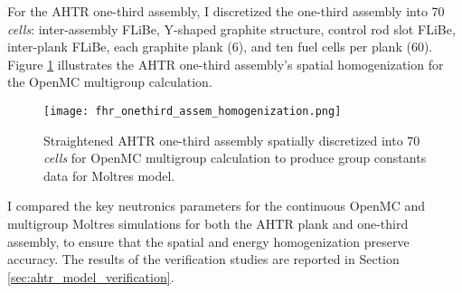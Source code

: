 For the \gls{AHTR} one-third assembly, I discretized the one-third assembly into 
70 \textit{cells}: inter-assembly \gls{FLiBe}, Y-shaped graphite structure, control 
rod slot \gls{FLiBe}, inter-plank \gls{FLiBe}, each graphite plank (6), and ten fuel 
cells per plank (60).
Figure \ref{fig:fhr_onethird_assem_homogenization} illustrates the \gls{AHTR} 
one-third assembly's spatial homogenization for the OpenMC multigroup calculation. 
\begin{figure}[htbp]
    \centering
    \texttt{[image: fhr\_onethird\_assem\_homogenization.png]}
    \raggedright
    \caption{Straightened \acrfull{AHTR} one-third assembly spatially discretized into 
    70 \textit{cells} for OpenMC multigroup calculation to produce group constants 
    data for Moltres model.}
    \label{fig:fhr_onethird_assem_homogenization}
\end{figure}

I compared the key neutronics parameters for the continuous OpenMC and multigroup 
Moltres simulations for both the \gls{AHTR} plank and one-third assembly, to ensure 
that the spatial and energy homogenization preserve accuracy.
The results of the verification studies are reported in Section 
\ref{sec:ahtr_model_verification}.

